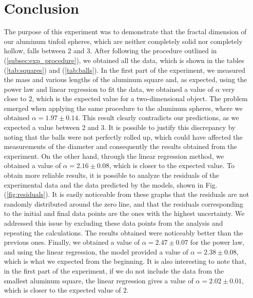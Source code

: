 \documentclass[a4paper,12pt]{article}
\begin{document}
\section{Conclusion}\label{sec:conclusion}
The purpose of this experiment was to demonstrate that the fractal dimension of our aluminum tinfoil spheres, 
which are neither completely solid nor completely hollow, falls between 2 and 3. 
After following the procedure outlined in (\ref{subsec:exp_procedure}), we obtained all the data, which is shown in the tables (\ref{tab:squares}) and (\ref{tab:balls}).
In the first part of the experiment, we measured the mass and various lengths of the aluminum square and, as expected, using the power law and linear regression to fit the data, 
we obtained a value of $\alpha$ very close to $2$, which is the expected value for a two-dimensional object. The problem emerged when applying the same procedure to the aluminum spheres,
where we obtained $\alpha =  1.97 \pm 0.14$. This result clearly contradicts our predictions, as we expected a value between $2$ and $3$. It is possible to justify this discrepancy
by noting that the balls were not perfectly rolled up, which could have affected the measurements of the diameter and consequently the results obtained from the experiment. On the other hand,
through the linear regression method, we obtained a value of $\alpha = 2.16 \pm 0.08$, which is closer to the expected value. 
To obtain more reliable results, it is possible to analyze the residuals of the experimental data and the data predicted by the models, shown in Fig. (\ref{fig:residuals}).
It is easily noticeable from these graphs that the residuals are not randomly distributed around the zero line, and that the residuals corresponding to the initial and final data points
are the ones with the highest uncertainty. We addressed this issue by excluding these data points from the analysis and repeating the calculations. The results obtained were noticeably better
than the previous ones. Finally, we obtained a value of $\alpha = 2.47 \pm 0.07$ for the power law, and using the linear regression, the model provided a value of $\alpha = 2.38 \pm 0.08$, 
which is what we expected from the beginning. It is also interesting to note that, in the first part of the experiment,
if we do not include the data from the smallest aluminum square, the linear regression gives a value of $\alpha = 2.02 \pm 0.01$, which is closer to the expected value of $2$.



\newpage
\printbibliography
\end{document}
